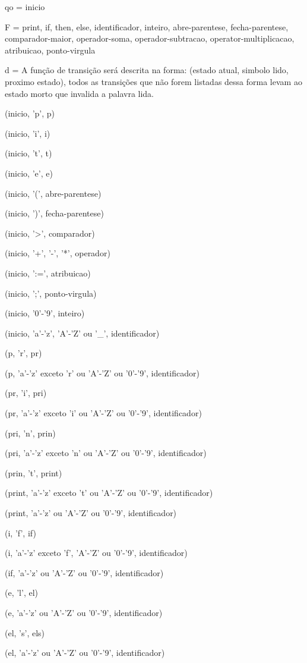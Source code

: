 \documentclass[12pt,a4paper,twoside]{report}
\begin{document}
qo = inicio

F = {print, if, then, else, identificador, inteiro, abre-parentese, fecha-parentese, comparador-maior, operador-soma, operador-subtracao, operator-multiplicacao, atribuicao, ponto-virgula}

d =
A função de transição será descrita na forma:
(estado atual, simbolo lido, proximo estado), todos as transições que não forem listadas dessa forma levam ao estado morto que invalida a palavra lida.

(inicio, 'p', p)

(inicio, 'i', i)

(inicio, 't', t)

(inicio, 'e', e)

(inicio, '(', abre-parentese)

(inicio, ')', fecha-parentese)

(inicio, '>', comparador)

(inicio, '+', '-', '*', operador)

(inicio, ':=', atribuicao)

(inicio, ';', ponto-virgula)

(inicio, '0'-'9', inteiro)

(inicio, 'a'-'z', 'A'-'Z' ou '\_', identificador)

(p, 'r', pr)

(p, 'a'-'z' exceto 'r' ou 'A'-'Z' ou '0'-'9', identificador)

(pr, 'i', pri)

(pr, 'a'-'z' exceto 'i' ou 'A'-'Z' ou '0'-'9', identificador)

(pri, 'n', prin)

(pri, 'a'-'z' exceto 'n' ou 'A'-'Z' ou '0'-'9', identificador)

(prin, 't', print)

(print, 'a'-'z' exceto 't' ou 'A'-'Z' ou '0'-'9', identificador)

(print, 'a'-'z' ou 'A'-'Z' ou '0'-'9', identificador)

(i, 'f', if)

(i, 'a'-'z' exceto 'f', 'A'-'Z' ou '0'-'9', identificador)

(if, 'a'-'z' ou 'A'-'Z' ou '0'-'9', identificador)

(e, 'l', el)

(e, 'a'-'z' ou 'A'-'Z' ou '0'-'9', identificador)

(el, 's', els)

(el, 'a'-'z' ou 'A'-'Z' ou '0'-'9', identificador)
\end{document}
